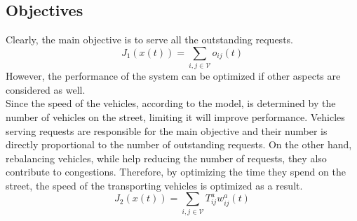 \subsection{Objectives}
Clearly, the main objective is to serve all the outstanding requests. 
\begin{equation}
	J_1(x(t)) = \sum_{i,j \in \mathcal{V}}o_{ij}(t)
\end{equation}
However, the performance of the system can be optimized if other aspects are considered as well.  \\
Since the speed of the vehicles, according to the model, is determined by the number of vehicles on the street, limiting it will improve performance. Vehicles serving requests are responsible for the main objective and their number is directly proportional to the number of outstanding requests. On the other hand, rebalancing vehicles, while help reducing the  number of requests, they also contribute to congestions. Therefore, by optimizing the time they spend on the street, the speed of the transporting vehicles is optimized as a result. 
\begin{equation}
	J_2(x(t)) = \sum_{i,j \in \mathcal{V}}T_{ij}^aw^a_{ij}(t)
\end{equation}

